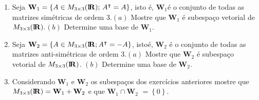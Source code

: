 \documentclass{report}
\begin{document}
\begin{Exercise}
\begin{enumerate}

\item \label{17lista3} Seja $\mathbf{W}_{1}=\left\{ A\in M_{3\times 3}(%
\mbox{${\rm I}\!\mbox{\boldmath $ {\rm R}$}$}%
);\,A^{\intercal }=A\right\} $, isto \'{e}, $\mathbf{W}_{1}$\'{e}
o conjunto de todas as matrizes sim\'{e}tricas de ordem
$3.$\newline $(a)$ Mostre que $\mathbf{W}_{1}$ \'{e} subespa\c{c}o
vetorial de $M_{3\times
3}(%
\mbox{${\rm I}\!\mbox{\boldmath $ {\rm R}$}$}%
).$\newline $(b)$ Determine uma base de $\mathbf{W}_{1}.$


\item \label{18lista3} Seja $\mathbf{W}_{2}=\left\{ A\in M_{3\times 3}(%
\mbox{${\rm I}\!\mbox{\boldmath $ {\rm R}$}$}%
;A^{\intercal }=-A\right\} $, isto\'{e}, $\mathbf{W}_{2}$ \'{e} o
conjunto de todas as matrizes anti-sim\'{e}tricas de ordem
3.\newline $(a)$ Mostre que $\mathbf{W}_{2}$ \'{e} subespa\c{c}o
vetorial de $M_{3\times
3}(%
\mbox{${\rm I}\!\mbox{\boldmath $ {\rm R}$}$}%
)$. \newline $(b)$ Determine uma base de $\mathbf{W}_{2}.$


\item \label{18lista3} Considerando $\mathbf{W}_{1}$ e
$\mathbf{W}_{2}$ os subespa\c{c}os
dos exerc\'{i}cios anteriores mostre que \linebreak $M_{3\times 3}(%
\mbox{${\rm I}\!\mbox{\boldmath $ {\rm R}$}$}%
)=\mathbf{W}_{1}+\mathbf{W}_{2}$ e que $\mathbf{W}_{1}\cap \mathbf{W}_{2}$ $%
=\left\{ 0\right\} .$


\end{enumerate}
\end{Exercise}
\end{document}
